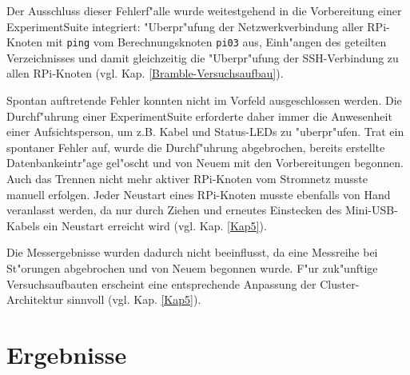 {
\noindent 
Der Ausschluss dieser Fehlerf"alle wurde weitestgehend in die Vorbereitung einer ExperimentSuite integriert: "Uberpr"ufung der Netzwerkverbindung aller RPi-Knoten mit \texttt{ping} vom Berechnungsknoten \texttt{pi03} aus, Einh"angen des geteilten Verzeichnisses und damit gleichzeitig die  "Uberpr"ufung der SSH-Verbindung zu allen RPi-Knoten (vgl. Kap. \ref{Bramble-Versuchsaufbau}). 

Spontan auftretende Fehler konnten nicht im Vorfeld ausgeschlossen werden. Die Durchf"uh\-rung einer ExperimentSuite erforderte daher immer die Anwesenheit einer Aufsichtsperson, um z.B. Kabel und Status-LEDs zu "uberpr"ufen. Trat ein spontaner Fehler auf, wurde die Durch\-f"uh\-rung abgebrochen, bereits erstellte Datenbankeintr"age gel"oscht und von Neuem mit den Vorbereitungen begonnen. Auch das Trennen nicht mehr aktiver RPi-Knoten vom Stromnetz musste manuell erfolgen. Jeder Neustart eines RPi-Knoten musste ebenfalls von Hand veranlasst werden, da nur durch Ziehen und erneutes Einstecken des Mini-USB-Kabels ein Neustart erreicht wird (vgl. Kap. \ref{Kap5}). 

Die Messergebnisse wurden dadurch nicht beeinflusst, da eine Messreihe bei St"orungen abgebrochen und von Neuem begonnen wurde. F"ur zuk"unftige Versuchsaufbauten erscheint eine entsprechende Anpassung der Cluster-Architektur sinnvoll (vgl. Kap. \ref{Kap5}).

\section{Ergebnisse}\label{Ergebnisse}

}
